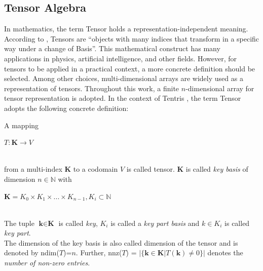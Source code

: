 \subsection{Tensor Algebra}
\label{sec:tensor_algebra}
In mathematics, the term Tensor holds a representation-independent meaning. According to \cite{rent}, Tensors are “objects with many indices that transform in a specific way under a change of
Basis”. This mathematical construct has many applications in physics, artificial intelligence, and other fields. However, for tensors to be applied in a practical context, a more concrete definition should be selected. Among other choices, multi-dimensional arrays are widely used as a representation of tensors. Throughout this work, a finite $n$-dimensional array for tensor representation is adopted.
In the context of Tentris \cite{tentris2020}, the term Tensor adopts the following concrete definition:

\begin{definition}[Tensor]
A mapping\\
\centerline{$T: \textbf{K} \to V$}\\
from a multi-index $\textbf{K}$ to a codomain $V$ is called tensor. $\textbf{K}$ is called \textit{key basis} of dimension $n \in \mathbb{N}$ with \\
\centerline{ $\textbf{K} = K_0 \times K_1 \times ... \times K_{n-1}, K_i \subset \mathbb{N}$ } \\
The tuple $\textbf{k} \in \textbf{K}$ is called \textit{key}, $K_i$ is called a \textit{key part basis} and $k \in K_i$ is called \textit{key part}.\\
The dimension of the key basis is also called dimension of the tensor and is denoted by ndim($T$)=$n$. Further, nnz($T$) = $|\{\textbf{k} \in \textbf{K} | T(\textbf{k})  \neq 0\}|$ denotes the \textit{ number of non-zero entries}.
\end{definition} 

